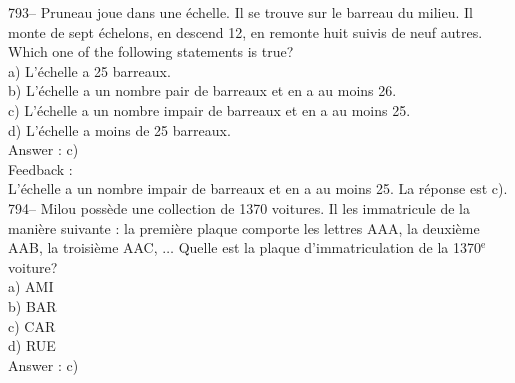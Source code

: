 \documentclass[letterpaper, 12pt]{article}
\begin{document}
793-- Pruneau joue dans une \'echelle.  Il se trouve sur le barreau du
milieu.  Il monte de sept \'echelons, en descend 12, en remonte huit suivis
de neuf autres.  Which one of the following statements is true?\\
a) L'\'echelle a 25 barreaux.\\
b) L'\'echelle a un nombre pair de barreaux et en a au moins 26.\\
c) L'\'echelle a un nombre impair de barreaux et en a au moins 25.\\
d) L'\'echelle a moins de 25 barreaux.\\

Answer : c)\\

Feedback : \\
L'\'echelle a un nombre impair de barreaux et en a au moins 25.  La
r\'eponse est c).\\

794-- Milou poss\`ede une collection de 1370 voitures.  Il les immatricule
de la mani\`ere suivante : la premi\`ere plaque comporte les lettres AAA, la
deuxi\`eme AAB, la troisi\`eme AAC, $\ldots$  Quelle est la plaque
d'immatriculation de la 1370$^{\textrm{e}}$ voiture?\\
a) AMI\\
b) BAR\\
c) CAR\\
d) RUE\\

Answer : c)\\
\end{document}
